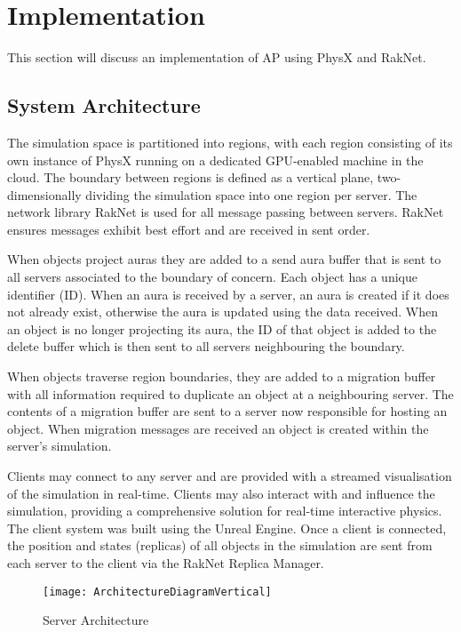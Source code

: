\chapter{Implementation}
This section will discuss an implementation of AP using PhysX and RakNet.


\section{System Architecture}
The simulation space is partitioned into regions, with each region consisting of its own instance of PhysX running on a dedicated GPU-enabled machine in the cloud. The boundary between regions is defined as a vertical plane, two-dimensionally dividing the simulation space into one region per server. The network library RakNet is used for all message passing between servers. RakNet ensures messages exhibit best effort and are received in sent order.

When objects project auras they are added to a send aura buffer that is sent to all servers associated to the boundary of concern. Each object has a unique identifier (ID). When an aura is received by a server, an aura is created if it does not already exist, otherwise the aura is updated using the data received. When an object is no longer projecting its aura, the ID of that object is added to the delete buffer which is then sent to all servers neighbouring the boundary.

When objects traverse region boundaries, they are added to a migration buffer with all information required to duplicate an object at a neighbouring server. The contents of a migration buffer are sent to a server now responsible for hosting an object. When migration messages are received an object is created within the server's simulation.

Clients may connect to any server and are provided with a streamed visualisation of the simulation in real-time. Clients may also interact with and influence the simulation, providing a comprehensive solution for real-time interactive physics. The client system was built using the Unreal Engine. Once a client is connected, the position and states (replicas) of all objects in the simulation are sent from each server to the client via the RakNet Replica Manager.

\begin{figure}[!t]
	\centering
	\texttt{[image: ArchitectureDiagramVertical]}
	\caption{Server Architecture}
	\label{fig_stack}
\end{figure}

